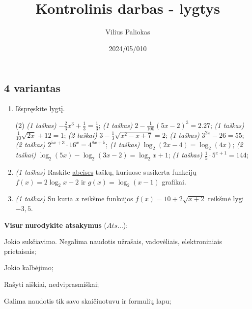 \documentclass[a4paper]{article}
\title{Kontrolinis darbas - lygtys}
\author{Vilius Paliokas}
\date{2024/05/010}
\begin{document}
\thispagestyle{fancy}

\titlespacing*{\subsection}{0pt}{.75ex}{0.75ex}

\subsection*{4 variantas}

\begin{enumerate}
      \item Išspręskite lygtį.
            \begin{tasks}[item-format={\normalfont}, after-item-skip=2mm](2)
                  \task \textit{(1 taškas)} $-\frac{2}{3}x^3+\frac{1}{3}=\frac{1}{3}$;
                  \task \textit{(1 taškas)} $2-\frac{1}{100}\left(5x-2\right)^3=2.27$;
                  \task \textit{(1 taškas)} $\frac{1}{10}\sqrt{2x}+12=1$;
                  \task \textit{(2 taškai)} $3-\frac{1}{3}\sqrt{x^2-x+7}=2$;
                  \task \textit{(1 taškas)} $3^{2x}-26=55$;
                  \task \textit{(2 taškas)} $2^{5x+3}\cdot16^{x}=4^{8x+5}$;
                  \task \textit{(1 taškas)} $\log_2(2x-4)=\log_2(4x)$;
                  \task \textit{(2 taškai)} $\log_2(5x)-\log_2(3x-2)=\log_2x+1$;
                  \task \textit{(1 taškas)} $\frac{1}{5}\cdot 5^{x+1}=144$;
            \end{tasks}

      \item \textit{(1 taškas)} Raskite \underline{abcises} taškų, kuriuose susikerta funkcijų $f(x)=2\log _2x-2$ ir $g(x)=\log _2\left(x-1\right)$ grafikai.
      \item \textit{(1 taškas)} Su kuria $x$ reikšme funkcijos $f(x)=10+2\sqrt{x+2}$ reikšmė lygi $-3,5$.
\end{enumerate}


\begin{small}
      \begin{enumerate*}[label={(\arabic*)}]
            \item \textbf{Visur} \textbf{nurodykite atsakymus} ($Ats\ldots$);
            \item Jokio sukčiavimo. Negalima naudotis užrašais, vadovėliais,
            elektroniniais prietaisais;
            \item Jokio kalbėjimo;
            \item Rašyti aiškiai, nedviprasmiškai;
            \item Galima naudotis tik savo skaičiuotuvu ir formulių lapu;
      \end{enumerate*}
\end{small}
\end{document}
